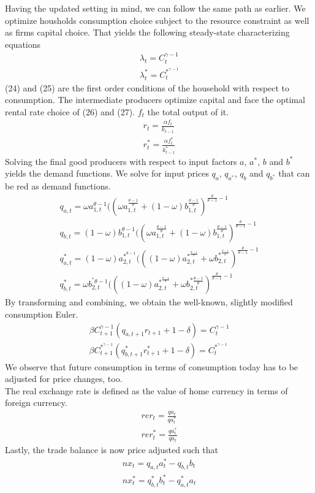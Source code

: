 \documentclass{article}
\begin{document}
Having the updated setting in mind, we can follow the same path as earlier. We optimize housholds consumption choice subject to the resource constraint as well as firms capital choice. That yields the following steady-state characterizing equations 
\begin{align}
\lambda_t = C_t^{\gamma-1} \\
\lambda_t^* = C_t^{*^{\gamma-1}}
\end{align}
(24) and (25) are the first order conditions of the household with respect to consumption. The intermediate producers optimize capital and face the optimal rental rate choice of (26) and (27). $f_t$ the total output of it.
\begin{align}
r_t = \frac{\alpha f_t}{k_{t-1}} \\
r_t^* = \frac{\alpha f_t^*}{k_{t-1}^*}
\end{align}
Solving the final good producers with respect to input factors $a$, $a^*$, $b$ and $b^*$ yields the demand functions. We solve for input prices $q_a$, $q_{a^*}$, $q_b$ and $q_{b^*}$ that can be red as demand functions.
\begin{align}
q_{a,t} = \omega a_{1,t}^{\theta-1} ((\omega a_{1, t}^{\frac{\theta-1}{\theta}} + (1- \omega) b_{1,t}^{\frac{\theta-1}{\theta}})^{\frac{\theta}{\theta-1} -1} \\
q_{b,t} = (1-\omega) b_{1,t}^{\theta-1} ((\omega a_{1,t}^{\frac{\theta-1}{\theta}} + (1-\omega) b_{1,t}^{\frac{\theta-1}{\theta}})^{\frac{\theta}{\theta-1} -1} \\
q_{a,t}^* = (1-\omega) a_{2,t}^{*^{\theta-1}} (((1-\omega) a_{2,t}^{*^{\frac{\theta-1}{\theta}}}+ \omega b_{2,t}^{*^{\frac{\theta-1}{\theta}}})^{\frac{\theta}{\theta-1} -1} \\
q_{b,t}^* = \omega b_{2,t}^{^*{\theta-1}} (((1-\omega) a_{2,t}^{*^{\frac{\theta-1}{\theta}}} + \omega b_{2,t}^{*{\frac{\theta-1}{\theta}}})^{\frac{\theta}{\theta-1}-1}
\end{align}
By transforming and combining, we obtain the well-known, slightly modified consumption Euler.
\begin{align}
\beta C_{t+1}^{\gamma-1} (q_{a,t+1} r_{t+1} + 1 - \delta)= C_t^{\gamma-1} \\
\beta C_{t+1}^{*^{\gamma-1}} (q_{b,t+1}^* r_{t+1}^* + 1 - \delta)= C_t^{*^{\gamma-1}} 
\end{align}
We observe that future consumption in terms of consumption today has to be adjusted for price changes, too. \\
The real exchange rate is defined as the value of home currency in terms of foreign currency.
\begin{align}
rer_t = \frac{qa_t}{qa_t^*} \\
rer_t^* = \frac{qa_t^*}{qa_t}
\end{align}
Lastly, the trade balance is now price adjusted such that
\begin{align}
nx_t = q_{a,t} a_t^* - q_{b,t} b_t \\
nx_t^* = q_{b,t}^* b_t^* - q_{a,t}^* a_t
\end{align}
\end{document}
